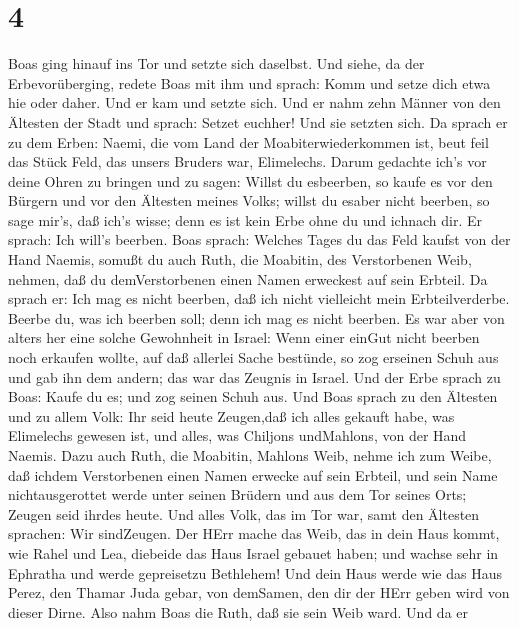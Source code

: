 \hypertarget{section-3}{%
\section{4}\label{section-3}}

 Boas ging hinauf ins Tor und setzte sich daselbst. Und
siehe, da der Erbevorüberging, redete Boas mit ihm und sprach: Komm und
setze dich etwa hie oder daher. Und er kam und setzte sich. 
Und er nahm zehn Männer von den Ältesten der Stadt und sprach: Setzet
euchher! Und sie setzten sich.  Da sprach er zu dem Erben:
Naemi, die vom Land der Moabiterwiederkommen ist, beut feil das Stück
Feld, das unsers Bruders war, Elimelechs.  Darum gedachte
ich's vor deine Ohren zu bringen und zu sagen: Willst du esbeerben, so
kaufe es vor den Bürgern und vor den Ältesten meines Volks; willst du
esaber nicht beerben, so sage mir's, daß ich's wisse; denn es ist kein
Erbe ohne du und ichnach dir. Er sprach: Ich will's beerben.
 Boas sprach: Welches Tages du das Feld kaufst von der Hand
Naemis, somußt du auch Ruth, die Moabitin, des Verstorbenen Weib,
nehmen, daß du demVerstorbenen einen Namen erweckest auf sein Erbteil.
 Da sprach er: Ich mag es nicht beerben, daß ich nicht
vielleicht mein Erbteilverderbe. Beerbe du, was ich beerben soll; denn
ich mag es nicht beerben.  Es war aber von alters her eine
solche Gewohnheit in Israel: Wenn einer einGut nicht beerben noch
erkaufen wollte, auf daß allerlei Sache bestünde, so zog erseinen Schuh
aus und gab ihn dem andern; das war das Zeugnis in Israel. 
Und der Erbe sprach zu Boas: Kaufe du es; und zog seinen Schuh aus.
 Und Boas sprach zu den Ältesten und zu allem Volk: Ihr seid
heute Zeugen,daß ich alles gekauft habe, was Elimelechs gewesen ist, und
alles, was Chiljons undMahlons, von der Hand Naemis.  Dazu
auch Ruth, die Moabitin, Mahlons Weib, nehme ich zum Weibe, daß ichdem
Verstorbenen einen Namen erwecke auf sein Erbteil, und sein Name
nichtausgerottet werde unter seinen Brüdern und aus dem Tor seines Orts;
Zeugen seid ihrdes heute.  Und alles Volk, das im Tor war,
samt den Ältesten sprachen: Wir sindZeugen. Der HErr mache das Weib, das
in dein Haus kommt, wie Rahel und Lea, diebeide das Haus Israel gebauet
haben; und wachse sehr in Ephratha und werde gepreisetzu Bethlehem!
 Und dein Haus werde wie das Haus Perez, den Thamar Juda
gebar, von demSamen, den dir der HErr geben wird von dieser Dirne.
 Also nahm Boas die Ruth, daß sie sein Weib ward. Und da er
